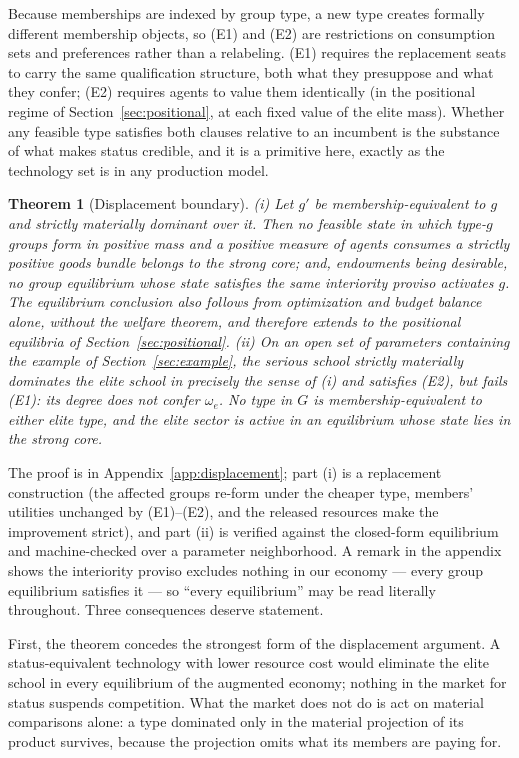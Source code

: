 \documentclass[12pt,letterpaper]{article}
\newtheorem{theorem}{Theorem}
\theoremstyle{definition}
\begin{document}
Because memberships are indexed by group type, a new type creates formally different membership objects, so (E1) and (E2) are restrictions on consumption sets and preferences rather than a relabeling.
(E1) requires the replacement seats to carry the same qualification structure, both what they presuppose and what they confer; (E2) requires agents to value them identically (in the positional regime of Section~\ref{sec:positional}, at each fixed value of the elite mass).
Whether any feasible type satisfies both clauses relative to an incumbent is the substance of what makes status credible, and it is a primitive here, exactly as the technology set is in any production model.

\begin{theorem}[Displacement boundary]\label{thm:displacement}
(i) Let $g'$ be membership-equivalent to $g$ and strictly materially dominant over it.
Then no feasible state in which type-$g$ groups form in positive mass and a positive measure of agents consumes a strictly positive goods bundle belongs to the strong core; and, endowments being desirable, no group equilibrium whose state satisfies the same interiority proviso activates $g$.
The equilibrium conclusion also follows from optimization and budget balance alone, without the welfare theorem, and therefore extends to the positional equilibria of Section~\ref{sec:positional}.
(ii) On an open set of parameters containing the example of Section~\ref{sec:example}, the serious school strictly materially dominates the elite school in precisely the sense of (i) and satisfies (E2), but fails (E1): its degree does not confer $\omega_e$.
No type in $G$ is membership-equivalent to either elite type, and the elite sector is active in an equilibrium whose state lies in the strong core.
\end{theorem}

The proof is in Appendix~\ref{app:displacement}; part (i) is a replacement construction (the affected groups re-form under the cheaper type, members' utilities unchanged by (E1)--(E2), and the released resources make the improvement strict), and part (ii) is verified against the closed-form equilibrium and machine-checked over a parameter neighborhood.
A remark in the appendix shows the interiority proviso excludes nothing in our economy --- every group equilibrium satisfies it --- so ``every equilibrium'' may be read literally throughout.
Three consequences deserve statement.

First, the theorem concedes the strongest form of the displacement argument.
A status-equivalent technology with lower resource cost would eliminate the elite school in every equilibrium of the augmented economy; nothing in the market for status suspends competition.
What the market does not do is act on material comparisons alone: a type dominated only in the material projection of its product survives, because the projection omits what its members are paying for.
\end{document}

